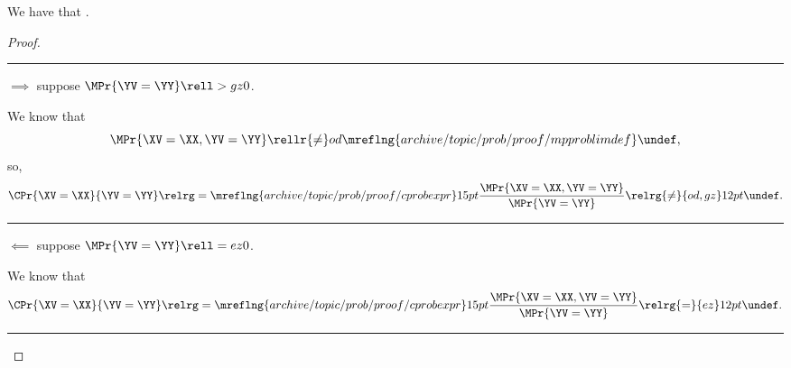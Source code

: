 \begin{proposition}
  We have that \cpproblimdefprop.%
\end{proposition}

\begin{proof}
  \hrule
  $\implies$ suppose $\MPr{\YV = \YY} \rell > gz 0$.

  We know that
  $$\MPr{\XV = \XX, \YV = \YY}
  \rellr {\ne} od {\mreflng{archive/topic/prob/proof/mpproblimdef}}
                    \undef,$$
  so, 
  $$ \CPr{\XV = \XX}{\YV = \YY} 
  \relrg = {\mreflng{archive/topic/prob/proof/cprobexpr}} 15pt
  \frac{\MPr{\XV = \XX, \YV = \YY}}{\MPr{\YV = \YY}}
  \relrg {\ne} {od,gz} 12pt \undef.$$
  \hrule
  $\impliedby$ suppose $\MPr{\YV = \YY} \rell = ez 0$.

  We know that
  $$ \CPr{\XV = \XX}{\YV = \YY} 
  \relrg = {\mreflng{archive/topic/prob/proof/cprobexpr}} 15pt
  \frac{\MPr{\XV = \XX, \YV = \YY}}{\MPr{\YV = \YY}}
  \relrg {=} {ez} 12pt \undef.$$
  \hrule
\end{proof}
